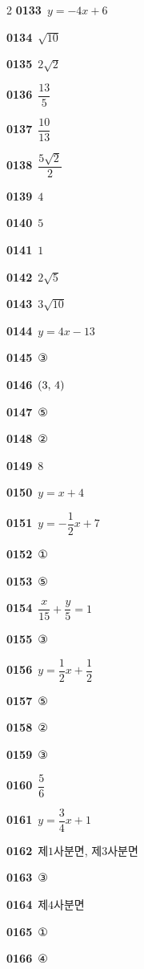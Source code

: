 \documentclass[10pt,a4paper]{article}
\begin{document}
\begin{multicols}{2}
\noindent\textbf{0133}\ $y=-4x+6$\par
\noindent\textbf{0134}\ $\sqrt{10}$\par
\noindent\textbf{0135}\ $2\sqrt{2}$\par
\noindent\textbf{0136}\ $\dfrac{13}{5}$\par
\noindent\textbf{0137}\ $\dfrac{10}{13}$\par
\noindent\textbf{0138}\ $\dfrac{5\sqrt{2}}{2}$\par
\noindent\textbf{0139}\ $4$\par
\noindent\textbf{0140}\ $5$\par
\noindent\textbf{0141}\ $1$\par
\noindent\textbf{0142}\ $2\sqrt{5}$\par
\noindent\textbf{0143}\ $3\sqrt{10}$\par
\noindent\textbf{0144}\ $y=4x-13$\par
\noindent\textbf{0145}\ ③\par
\noindent\textbf{0146}\ $(3,\mkern3mu 4)$\par
\noindent\textbf{0147}\ ⑤\par
\noindent\textbf{0148}\ ②\par
\noindent\textbf{0149}\ $8$\par
\noindent\textbf{0150}\ $y=x+4$\par
\noindent\textbf{0151}\ $y=-\dfrac{1}{2}x+7$\par
\noindent\textbf{0152}\ ①\par
\noindent\textbf{0153}\ ⑤\par
\noindent\textbf{0154}\ $\dfrac{x}{15}+\dfrac{y}{5}=1$\par
\noindent\textbf{0155}\ ③\par
\noindent\textbf{0156}\ $y=\dfrac{1}{2}x+\dfrac{1}{2}$\par
\noindent\textbf{0157}\ ⑤\par
\noindent\textbf{0158}\ ②\par
\noindent\textbf{0159}\ ③\par
\noindent\textbf{0160}\ $\dfrac{5}{6}$\par
\noindent\textbf{0161}\ $y=\dfrac{3}{4}x+1$\par
\noindent\textbf{0162}\ 제$1$사분면, 제$3$사분면\par
\noindent\textbf{0163}\ ③\par
\noindent\textbf{0164}\ 제$4$사분면\par
\noindent\textbf{0165}\ ①\par
\noindent\textbf{0166}\ ④\par

\end{multicols}
\end{document}
